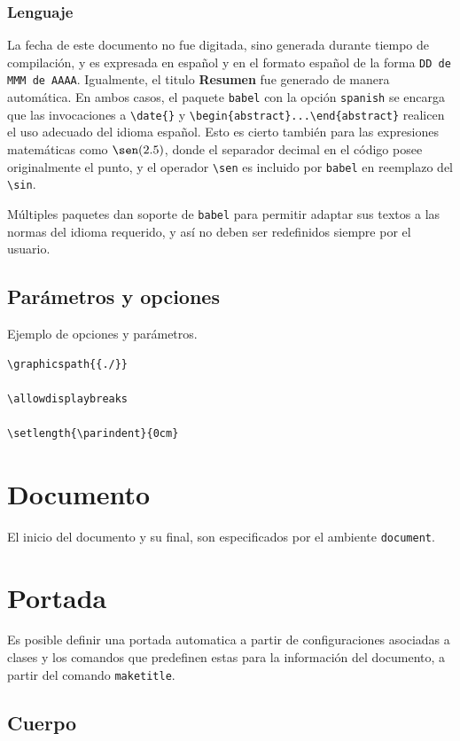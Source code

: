 \documentclass[12pt]{article}
\begin{document}
\subsubsection{Lenguaje}

La fecha de este documento no fue digitada, sino generada durante tiempo de compilación, y es expresada en español y en el formato español de la forma \verb-DD de MMM de AAAA-. Igualmente, el titulo \textbf{Resumen} fue generado de manera automática. En ambos casos, el paquete \verb-babel- con la opción \verb-spanish- se encarga que las invocaciones a \verb-\date{}- y \verb-\begin{abstract}...\end{abstract}- realicen el uso adecuado del idioma español. Esto es cierto también para las expresiones matemáticas como $\sen(2.5)$, donde el separador decimal en el código posee originalmente el punto, y el operador \verb-\sen- es incluido por \verb-babel- en reemplazo del \verb-\sin-.

Múltiples paquetes dan soporte de \verb-babel- para permitir adaptar sus textos a las normas del idioma requerido, y así no deben ser redefinidos siempre por el usuario.

\subsection{Parámetros y opciones}
Ejemplo de opciones y parámetros.
\begin{verbatim}
\graphicspath{{./}}

\allowdisplaybreaks

\setlength{\parindent}{0cm}
\end{verbatim}

\section{Documento}
El inicio del documento y su final, son especificados por el ambiente \verb-document-.

\section{Portada}

Es posible definir una portada automatica a partir de configuraciones asociadas a clases y los comandos que predefinen estas para la información del documento, a partir del comando \verb-maketitle-.

\subsection{Cuerpo}
\end{document}
